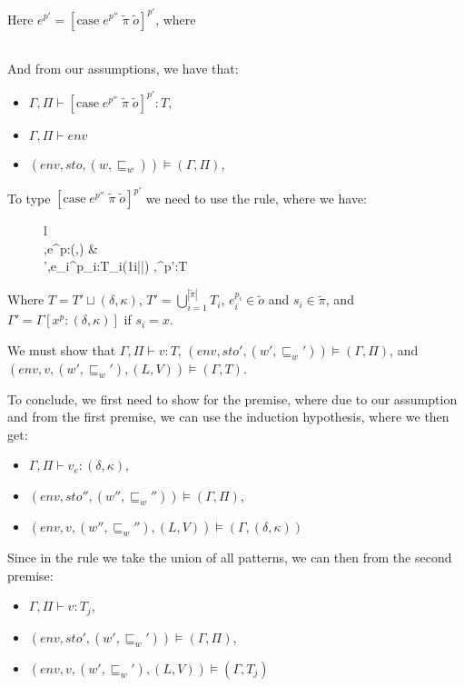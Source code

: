 \item[\runa{Case}] Here $e^{p'}=\left[\mbox{case}\;e^{p''}\;\tilde{\pi}\;\tilde{o}\right]^{p'}$, where
\begin{figure}[H]
	\setlength\tabcolsep{8pt}
	\begin{tabular}{l}
		
	\end{tabular}
\end{figure}

And from our assumptions, we have that:
\begin{itemize}
	\item $\Gamma,\Pi\vdash \left[\mbox{case}\;e^{p''}\;\tilde{\pi}\;\tilde{o}\right]^{p'}:T$,
	\item $\Gamma,\Pi\vdash env$
	\item $(env,sto,(w,\sqsubseteq_w))\models(\Gamma,\Pi)$,
\end{itemize}
To type $[\mbox{case}\;e^{p''}\;\tilde{\pi}\;\tilde{o}]^{p'}$ we need to use the  rule, where we have:
\begin{figure}[H]
	\setlength\tabcolsep{8pt}
	\begin{tabular}{l}
		\runa{T-Case}\\[0.2cm]
			\inference[]
				{\Gamma,\Pi\vdash e^{p}:(\delta,\kappa) &\\
				\Gamma',\Pi\vdash e_i^{p_i}:T_i\;\;\;(1\leq i\leq|\tilde{\pi}|)}
				{\Gamma,\Pi\vdash [\mbox{case}\;e^{p}\;\tilde{\pi}\;\tilde{o}]^{p'}:T}
	\end{tabular}
\end{figure}
Where $T=T'\sqcup(\delta,\kappa)$, $T'=\bigcup_{i=1}^{|\tilde{\pi}|}T_i$, $e_i^{p_i}\in\tilde{o}$ and $s_i\in\tilde{\pi}$, and $\Gamma'=\Gamma[x^p:(\delta,\kappa)]$ if $s_i=x$.

We must show that  $\Gamma,\Pi\vdash v:T$,  $(env,sto',(w',\sqsubseteq_w'))\models(\Gamma,\Pi)$, and \\
 $(env,v,(w',\sqsubseteq_w'),(L,V))\models(\Gamma,T)$.

To conclude, we first need to show for the premise, where due to our assumption and from the first premise, we can use the induction hypothesis, where we then get:
\begin{itemize}
	\item $\Gamma,\Pi\vdash v_e:(\delta,\kappa)$,
	\item $(env,sto'',(w'',\sqsubseteq_w''))\models(\Gamma,\Pi)$,
	\item $(env,v,(w'',\sqsubseteq_w''),(L,V))\models(\Gamma,(\delta,\kappa))$
\end{itemize}
Since in the rule  we take the union of all patterns, we can then from the second premise:
\begin{itemize}
	\item $\Gamma,\Pi\vdash v:T_j$,
	\item $(env,sto',(w',\sqsubseteq_w'))\models(\Gamma,\Pi)$,
	\item $(env,v,(w',\sqsubseteq_w'),(L,V))\models(\Gamma,T_j)$
\end{itemize}


